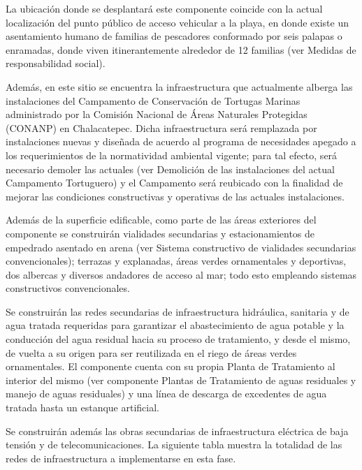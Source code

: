 \documentclass{article}
\begin{document}
\begin{multicols}{2}
La ubicación donde se desplantará este componente coincide con la actual localización del punto público de acceso vehicular a la playa, en donde existe un asentamiento humano de familias de pescadores conformado por seis palapas o enramadas, donde viven itinerantemente alrededor de 12 familias (ver Medidas de responsabilidad social). 

Además, en este sitio se encuentra la infraestructura que actualmente alberga las instalaciones del Campamento de Conservación de Tortugas Marinas administrado por la Comisión Nacional de Áreas Naturales Protegidas (CONANP) en Chalacatepec. Dicha infraestructura será remplazada por instalaciones nuevas y diseñada de acuerdo al programa de necesidades apegado a los requerimientos de la normatividad ambiental vigente; para tal efecto, será necesario demoler las actuales (ver Demolición de las instalaciones del actual Campamento Tortuguero) y el Campamento será reubicado con la finalidad de mejorar las condiciones constructivas y operativas de las actuales instalaciones. 

Además de la superficie edificable, como parte de las áreas exteriores del componente se construirán vialidades secundarias y estacionamientos de empedrado asentado en arena (ver Sistema constructivo de vialidades secundarias convencionales); terrazas y explanadas, áreas verdes ornamentales y deportivas, dos albercas y diversos andadores de acceso al mar; todo esto empleando sistemas constructivos convencionales. 

Se construirán las redes secundarias de infraestructura hidráulica, sanitaria y de agua tratada requeridas para garantizar el abastecimiento de agua potable y la conducción del agua residual hacia su proceso de tratamiento, y desde el mismo, de vuelta a su origen para ser reutilizada en el riego de áreas verdes ornamentales. El componente cuenta con su propia Planta de Tratamiento al interior del mismo (ver componente Plantas de Tratamiento de aguas residuales y manejo de aguas residuales) y una línea de descarga de excedentes de agua tratada hasta un estanque artificial.

Se construirán además las obras secundarias de infraestructura eléctrica de baja tensión y de telecomunicaciones. La siguiente tabla muestra la totalidad de las redes de infraestructura a implementarse en esta fase.


\bigskip


\bigskip

\begin{flushleft}
\begin{tabular}{|m{1.823cm}m{2.277cm}|m{0.99799997cm}|m{0.999cm}|}


\end{tabular}
\end{flushleft}
\end{multicols}
\end{document}
